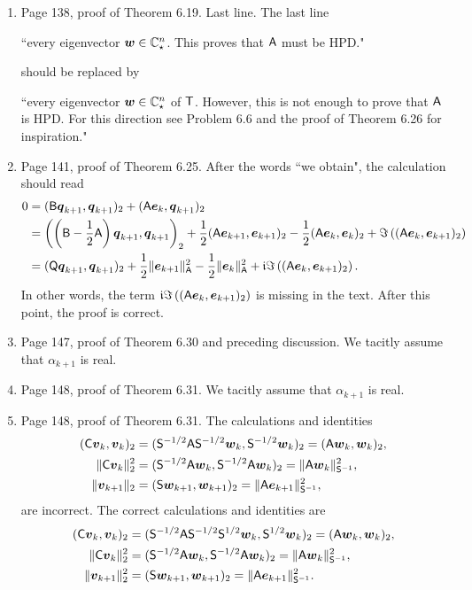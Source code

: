 \documentclass{book}
\begin{document}
\begin{enumerate}
	\item
Page 138, proof of Theorem 6.19. Last line. The last line

\hspace{0.25in}``every eigenvector $\boldsymbol{w}\in\mathbb C^n_\star$. This proves that $\mathsf{A}$ must be HPD."

\noindent should be replaced by

\hspace{0.25in}``every eigenvector $\boldsymbol{w}\in\mathbb C^n_\star$ of $\mathsf{T}$. However, this is not enough to prove that $\mathsf{A}$ is HPD. For this direction see Problem 6.6 and the proof of Theorem 6.26 for inspiration."

	\item
Page 141, proof of Theorem 6.25. After the words ``we obtain", the calculation should read
	\begin{align*}
0 &=  (\mathsf{B}\boldsymbol{q}_{k+1},\boldsymbol{q}_{k+1})_2 + (\mathsf{A}\boldsymbol{e}_k,\boldsymbol{q}_{k+1})_2 
	\\
&=  \left( \left(\mathsf{B}-\frac12\mathsf{A} \right)\boldsymbol{q}_{k+1},\boldsymbol{q}_{k+1} \right)_2 + \frac12(\mathsf{A}\boldsymbol{e}_{k+1},\boldsymbol{e}_{k+1})_2 - \frac12(\mathsf{A}\boldsymbol{e}_k,\boldsymbol{e}_k)_2 + \Im\left((\mathsf{A}\boldsymbol{e}_k,\boldsymbol{e}_{k+1})_2 \right)
	\\
& =  (\mathsf{Q}\boldsymbol{q}_{k+1},\boldsymbol{q}_{k+1})_2 + \frac12 \| \boldsymbol{e}_{k+1} \|_{\mathsf{A}}^2 - \frac12 \| \boldsymbol{e}_k \|_{\mathsf{A}}^2 + \mathfrak{i}\Im\left((\mathsf{A}\boldsymbol{e}_k,\boldsymbol{e}_{k+1})_2 \right).
	\end{align*}
In other words, the term $\mathfrak{i}\Im\left((\mathsf{A}\boldsymbol{e}_k,\boldsymbol{e}_{k+1})_2 \right)$ is missing in the text. After this point, the proof is correct.

	\item
Page 147, proof of Theorem 6.30 and preceding discussion. We tacitly assume that $\alpha_{k+1}$ is real.

	\item
Page 148, proof of Theorem 6.31. We tacitly assume that $\alpha_{k+1}$ is real.

	\item
Page 148, proof of Theorem 6.31.  The calculations and identities 
\begin{align*}
  (\mathsf{C}\boldsymbol{v}_k,\boldsymbol{v}_k)_2 &= (\mathsf{S}^{-1/2}\mathsf{A}\mathsf{S}^{-1/2}\boldsymbol{w}_k,\mathsf{S}^{-1/2}\boldsymbol{w}_k)_2 = (\mathsf{A}\boldsymbol{w}_k,\boldsymbol{w}_k)_2, \\ 
  \| \mathsf{C}\boldsymbol{v}_k \|_2^2 &= (\mathsf{S}^{-1/2}\mathsf{A}\boldsymbol{w}_k,\mathsf{S}^{-1/2}\mathsf{A}\boldsymbol{w}_k)_2 = \| \mathsf{A}\boldsymbol{w}_k \|_{\mathsf{S}^{-1}}^2, \\
  \| \boldsymbol{v}_{k+1} \|_2 & = (\mathsf{S}\boldsymbol{w}_{k+1},\boldsymbol{w}_{k+1} )_2 = \| \mathsf{A}\boldsymbol{e}_{k+1} \|_{\mathsf{S}^{-1}}^2,
\end{align*}
are incorrect. The correct calculations and identities are
	\begin{align*}
(\mathsf{C}\boldsymbol{v}_k,\boldsymbol{v}_k)_2 &= (\mathsf{S}^{-1/2}\mathsf{A}\mathsf{S}^{-1/2}\mathsf{S}^{1/2}\boldsymbol{w}_k,\mathsf{S}^{1/2}\boldsymbol{w}_k)_2 = (\mathsf{A}\boldsymbol{w}_k,\boldsymbol{w}_k)_2, 
	\\ 
  \| \mathsf{C}\boldsymbol{v}_k \|_2^2 &= (\mathsf{S}^{-1/2}\mathsf{A}\boldsymbol{w}_k,\mathsf{S}^{-1/2}\mathsf{A}\boldsymbol{w}_k)_2 = \| \mathsf{A}\boldsymbol{w}_k \|_{\mathsf{S}^{-1}}^2, \\
  \| \boldsymbol{v}_{k+1} \|_2^2 & = (\mathsf{S}\boldsymbol{w}_{k+1},\boldsymbol{w}_{k+1} )_2 = \| \mathsf{A}\boldsymbol{e}_{k+1} \|_{\mathsf{S}^{-1}}^2.
\end{align*}


	\end{enumerate}
	
\end{document}
